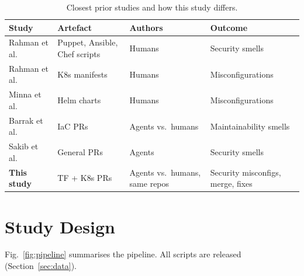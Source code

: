\documentclass[10pt,conference]{IEEEtran}
\begin{document}
\begin{table}[t]
\centering
\caption{Closest prior studies and how this study differs.}
\label{tab:positioning}
\footnotesize
\begin{tabular}{@{}p{2.1cm}p{1.6cm}p{1.6cm}p{1.9cm}@{}}
\toprule
Study & Artefact & Authors & Outcome \\
\midrule
Rahman et al.~\cite{rahman2019sins,rahman2021ansible} & Puppet, Ansible, Chef scripts & Humans & Security smells \\
Rahman et al.~\cite{rahman2023k8s} & K8s manifests & Humans & Misconfigurations \\
Minna et al.~\cite{minna2025helm} & Helm charts & Humans & Misconfigurations \\
Barrak et al.~\cite{barrak2026agents} & IaC PRs & Agents vs.\ humans & Maintainability smells \\
Sakib et al.~\cite{sakib2026trust} & General PRs & Agents & Security smells \\
\textbf{This study} & TF + K8s PRs & Agents vs.\ humans, same repos & Security misconfigs, merge, fixes \\
\bottomrule
\end{tabular}
\end{table}

\section{Study Design}
Fig.~\ref{fig:pipeline} summarises the pipeline. All scripts are released (Section~\ref{sec:data}).
\end{document}
